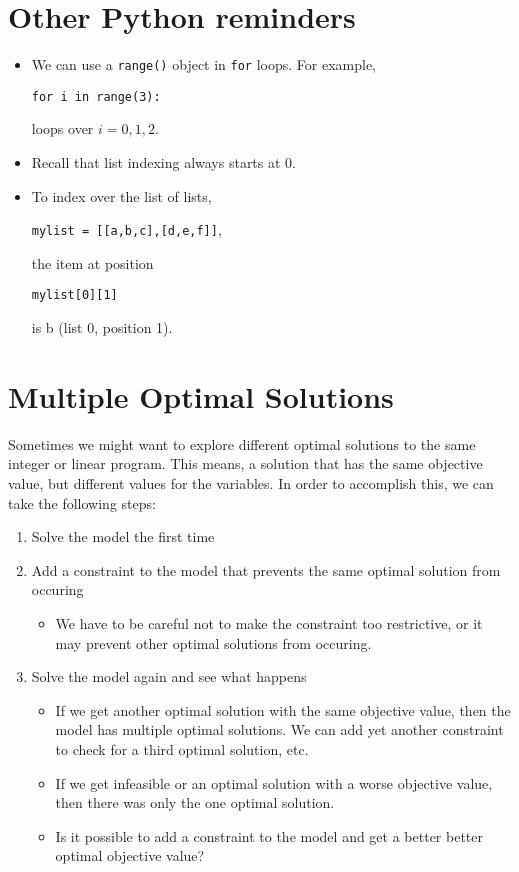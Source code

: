 \documentclass[11pt]{article}
\theoremstyle{definition}
\begin{document}
\section{Other Python reminders}
\begin{itemize}
\item We can use a \texttt{range()} object in \texttt{for} loops.  For example,
\begin{center} \texttt{for i in range(3):}  \end{center}
loops over $i = 0, 1, 2$.
\item  Recall that list indexing always starts at 0.
\item To index over the list of lists,
\begin{center} \texttt{mylist = [[a,b,c],[d,e,f]]}, \end{center}
the item at position 
\begin{center} \texttt{mylist[0][1]} \end{center}
is b (list 0, position 1).
\end{itemize}


\section{Multiple Optimal Solutions}

Sometimes we might want to explore different optimal solutions to the same integer or linear program.  This means, a solution that has the same objective value, but different values for the variables.  In order to accomplish this, we can take the following steps:
\begin{enumerate}
\item Solve the model the first time
\item Add a constraint to the model that prevents the same optimal solution from occuring
\begin{itemize}
\item We have to be careful not to make the constraint too restrictive, or it may prevent other optimal solutions from occuring.
\end{itemize}
\item Solve the model again and see what happens
\begin{itemize}
\item If we get another optimal solution with the same objective value, then the model has multiple optimal solutions.  We can add yet another constraint to check for a third optimal solution, etc.
\item If we get infeasible or an optimal solution with a worse objective value, then there was only the one optimal solution.
\item Is it possible to add a constraint to the model and get a better better optimal objective value?
\end{itemize}
\end{enumerate}
\end{document}
